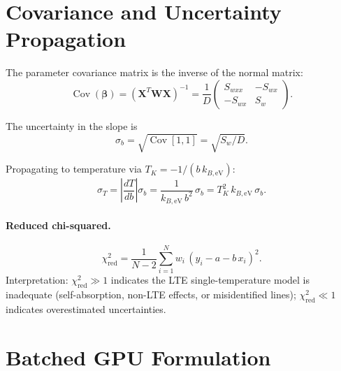 \documentclass[11pt]{article}
\newcommand{\kbeV}{k_{B,\text{eV}}}
\begin{document}
\section{Covariance and Uncertainty Propagation}
\label{sec:covariance}

The parameter covariance matrix is the inverse of the normal matrix:
\begin{equation}
  \operatorname{Cov}(\boldsymbol{\beta})
  = (\mathbf{X}^T\mathbf{W}\mathbf{X})^{-1}
  = \frac{1}{D}\begin{pmatrix} S_{wxx} & -S_{wx} \\ -S_{wx} & S_w \end{pmatrix}.
  \label{eq:covariance}
\end{equation}

The uncertainty in the slope is
\begin{equation}
  \sigma_b = \sqrt{\operatorname{Cov}[1,1]} = \sqrt{S_w / D}.
  \label{eq:sigma_b}
\end{equation}

Propagating to temperature via $T_K = -1/(b\,\kbeV)$:
\begin{equation}
  \sigma_T = \left|\frac{dT}{db}\right|\sigma_b
  = \frac{1}{\kbeV\,b^2}\,\sigma_b
  = T_K^2\,\kbeV\,\sigma_b.
  \label{eq:sigma_T}
\end{equation}

\paragraph{Reduced chi-squared.}
\begin{equation}
  \chi^2_{\text{red}} = \frac{1}{N-2}\sum_{i=1}^N w_i\,(y_i - a - b\,x_i)^2.
  \label{eq:chi2red}
\end{equation}
Interpretation: $\chi^2_{\text{red}} \gg 1$ indicates the LTE single-temperature model
is inadequate (self-absorption, non-LTE effects, or misidentified lines);
$\chi^2_{\text{red}} \ll 1$ indicates overestimated uncertainties.


\section{Batched GPU Formulation}
\label{sec:batch}
\end{document}
